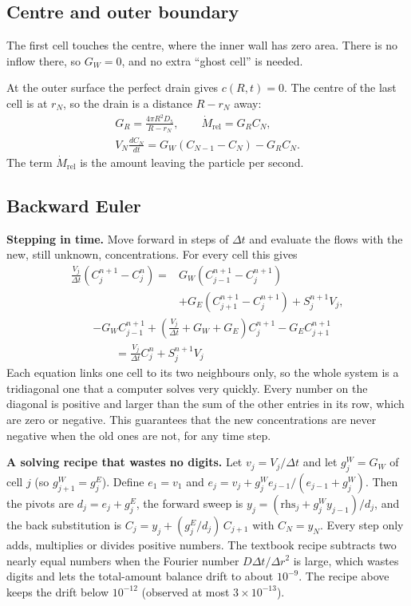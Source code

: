 \documentclass[11pt]{article}
\begin{document}
\subsection{Centre and outer boundary}
The first cell touches the centre, where the inner wall has zero area. There is no inflow there, so $G_W=0$, and no extra ``ghost cell'' is needed.

At the outer surface the perfect drain gives $c(R,t)=0$. The centre of the last cell is at $r_N$, so the drain is a distance $R-r_N$ away:
\begin{equation}
\begin{gathered}
G_R=\frac{4\pi R^2D_5}{R-r_N},\qquad \dot M_{\mathrm{rel}}=G_RC_N,\\
V_N\frac{dC_N}{dt}=G_W(C_{N-1}-C_N)-G_RC_N.
\end{gathered}
\tag{TRISO-DEL-030}
\end{equation}
The term $\dot M_{\mathrm{rel}}$ is the amount leaving the particle per second.

\subsection{Backward Euler}
\textbf{Stepping in time.} Move forward in steps of $\Delta t$ and evaluate the flows with the new, still unknown, concentrations. For every cell this gives
\[
\begin{aligned}
\frac{V_j}{\Delta t}\left(C_j^{n+1}-C_j^n\right)={}&G_W\left(C_{j-1}^{n+1}-C_j^{n+1}\right)\\
&+G_E\left(C_{j+1}^{n+1}-C_j^{n+1}\right)+S_j^{n+1}V_j,
\end{aligned}
\]
\begin{equation}
\begin{aligned}
&-G_WC_{j-1}^{n+1}+\left(\frac{V_j}{\Delta t}+G_W+G_E\right)C_j^{n+1}-G_EC_{j+1}^{n+1}\\
&\qquad=\frac{V_j}{\Delta t}C_j^n+S_j^{n+1}V_j
\end{aligned}
\tag{TRISO-DEL-040}
\end{equation}
Each equation links one cell to its two neighbours only, so the whole system is a tridiagonal one that a computer solves very quickly. Every number on the diagonal is positive and larger than the sum of the other entries in its row, which are zero or negative. This guarantees that the new concentrations are never negative when the old ones are not, for any time step.

\textbf{A solving recipe that wastes no digits.} Let $v_j=V_j/\Delta t$ and let $g_j^W=G_W$ of cell $j$ (so $g^W_{j+1}=g^E_j$). Define $e_1=v_1$ and $e_j=v_j+g^W_je_{j-1}/(e_{j-1}+g^W_j)$. Then the pivots are $d_j=e_j+g^E_j$, the forward sweep is $y_j=(\mathrm{rhs}_j+g^W_jy_{j-1})/d_j$, and the back substitution is $C_j=y_j+(g^E_j/d_j)\,C_{j+1}$ with $C_N=y_N$. Every step only adds, multiplies or divides positive numbers. The textbook recipe subtracts two nearly equal numbers when the Fourier number $D\Delta t/\Delta r^2$ is large, which wastes digits and lets the total-amount balance drift to about $10^{-9}$. The recipe above keeps the drift below $10^{-12}$ (observed at most $3\times10^{-13}$).
\end{document}
